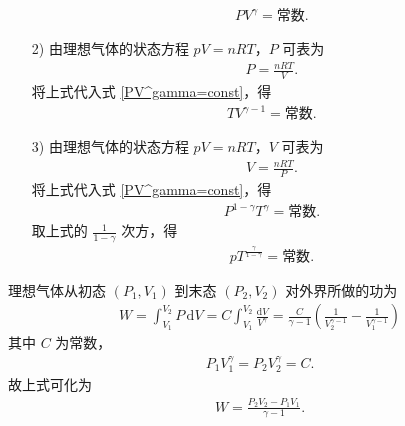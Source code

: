 \documentclass{assignment}
\begin{document}
\begin{sol}
\begin{itemize}
\begin{align}
            \label{PV^gamma=const}
            PV^{\gamma}=\text{常数}.
        \end{align}
        \item[2)] 由理想气体的状态方程 $pV=nRT$，$P$ 可表为
        \begin{align}
            P=\frac{nRT}{V}.
        \end{align}
        将上式代入式 \eqref{PV^gamma=const}，得
        \begin{align}
            TV^{\gamma-1}=\text{常数}.
        \end{align}
        \item[3)] 由理想气体的状态方程 $pV=nRT$，$V$ 可表为
        \begin{align}
            V=\frac{nRT}{P}.
        \end{align}
        将上式代入式 \eqref{PV^gamma=const}，得
        \begin{align}
            P^{1-\gamma}T^{\gamma}=\text{常数}.
        \end{align}
        取上式的 $\frac{1}{1-\gamma}$ 次方，得
        \begin{align}
            pT^{\frac{\gamma}{1-\gamma}}=\text{常数}.
        \end{align}
    \end{itemize}

    理想气体从初态 $(P_1,V_1)$ 到末态 $(P_2,V_2)$ 对外界所做的功为
    \begin{align}
        W=\int_{V_1}^{V_2}P\,\mathrm{d}V=C\int_{V_1}^{V_2}\frac{\mathrm{d}V}{V^{\gamma}}=\frac{C}{\gamma-1}\left(\frac{1}{V_2^{\gamma-1}}-\frac{1}{V_1^{\gamma-1}}\right)
    \end{align}
    其中 $C$ 为常数，
    \begin{align}
        P_1V_1^{\gamma}=P_2V_2^{\gamma}=C.
    \end{align}
    故上式可化为
    \begin{align}
        W=\frac{P_2V_2-P_1V_1}{\gamma-1}.
    \end{align}
\end{sol}
\end{document}
